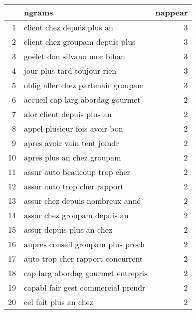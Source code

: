 \begin{tabular}{|r|l|r|}
  \hline
 & ngrams & nappear \\ 
  \hline
1 & client chez depuis plus an &   3 \\ 
  2 & client chez groupam depuis plus &   3 \\ 
  3 & goélet don silvano mor bihan &   3 \\ 
  4 & jour plus tard toujour rien &   3 \\ 
  5 & oblig aller chez partenair groupam &   3 \\ 
  6 & accueil cap larg abordag gourmet &   2 \\ 
  7 & alor client depuis plus an &   2 \\ 
  8 & appel plusieur fois avoir bon &   2 \\ 
  9 & apres avoir vain tent joindr &   2 \\ 
  10 & apres plus an chez groupam &   2 \\ 
  11 & assur auto beaucoup trop cher &   2 \\ 
  12 & assur auto trop cher rapport &   2 \\ 
  13 & assur chez depuis nombreux anné &   2 \\ 
  14 & assur chez groupam depuis an &   2 \\ 
  15 & assur depuis plus an chez &   2 \\ 
  16 & aupres conseil groupam plus proch &   2 \\ 
  17 & auto trop cher rapport concurrent &   2 \\ 
  18 & cap larg abordag gourmet entrepris &   2 \\ 
  19 & capabl fair gest commercial prendr &   2 \\ 
  20 & cel fait plus an chez &   2 \\ 
   \hline
\end{tabular}
